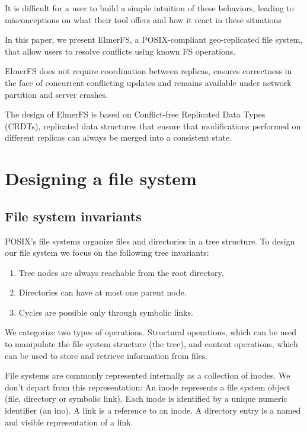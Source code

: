 \documentclass[sigconf,anonymous,10pt]{acmart}
\begin{document}
It is difficult for a user to build a simple intuition of these behaviors,
leading to misconceptions on what their tool offers and how it react in these situations~\cite{tang2013you}

In this paper, we present ElmerFS, a POSIX-compliant geo-replicated
file system, that allow users to resolve conflicts using known FS operations.

ElmerFS does not require coordination between replicas, ensures correctness in the face of concurrent conflicting updates and remains available under network partition and server crashes.

The design of ElmerFS is based on Conflict-free Replicated Data Types (CRDTs), replicated data structures that ensure that modifications performed on different replicas can always be merged into a consistent state.

\section{Designing a file system}

\subsection{File system invariants}

POSIX's file systems organize files and directories in a tree structure.
To design our file system we focus on the following tree invariants:

\begin{enumerate}
\item Tree nodes are always reachable from the root directory.
\item Directories can have at most one parent node.
\item Cycles are possible only through symbolic links.
\end{enumerate}

We categorize two types of operations.
Structural operations, which can be used to manipulate the file system
structure (the tree), and content operations,
which can be used to store and retrieve information from files.

File systems are commonly represented internally as a collection of inodes.
We don't depart from this representation:
An inode represents a file system object (file, directory or symbolic link).
Each inode is identified by a unique numeric identifier (an ino).
A link is a reference to an inode. A directory entry is a named and visible representation of a link.
\end{document}

